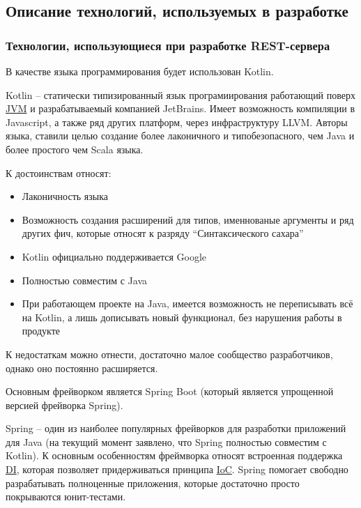 \subsection{Описание технологий, используемых в разработке}\label{subsec:2-tech-review}\indent


\subsubsection{Технологии, использующиеся при разработке REST-сервера}\indent

В качестве языка программирования будет использован Kotlin.

Kotlin – статически типизированный язык програмиирования работающий поверх \hyperlink{gloss:jvm}{JVM} и разрабатываемый компанией JetBrains. Имеет возможность компиляции в Javascript, а также ряд других платформ, через инфраструктуру LLVM. Авторы языка, ставили целью создание более лаконичного и типобезопасного, чем Java и более простого чем Scala языка.

К достоинствам относят:
\begin{itemize}
    \item Лаконичность языка
    \item Возможность создания расширений для типов, именнованые аргументы и ряд других фич, которые относят к разряду “Синтаксического сахара”
    \item Kotlin официально поддерживается Google
    \item Полностью совместим с Java
    \item При работающем проекте на Java, имеется возможность не переписывать всё на Kotlin, а лишь дописывать новый функционал, без нарушения работы в продукте
\end{itemize}

К недостаткам можно отнести, достаточно малое сообщество разработчиков, однако оно постоянно расширяется.

Основным фрейворком является Spring Boot (который является упрощенной версией фрейворка Spring).

Spring – один из наиболее популярных фрейворков для разработки приложений для Java (на текущий момент заявлено, что Spring полностью совместим с Kotlin).
К основным особенностям фреймворка относят встроенная поддержка \hyperlink{gloss:di}{DI}, которая позволяет придерживаться принципа \hyperlink{gloss:ioc}{IoC}.
Spring помогает свободно разрабатывать полноценные приложения, которые достаточно просто покрываются юнит-тестами.

